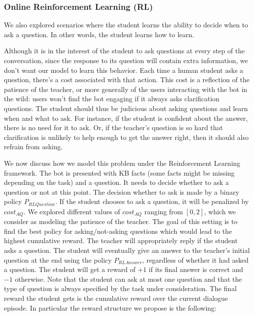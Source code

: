 \subsubsection{Online Reinforcement Learning (RL)}
We also explored scenarios where the student
learns the ability to decide when to ask a question. In other
words, the student learns how to learn.

Although it is in the interest of the student to ask questions at every
step of the conversation, since the response to its question will contain
extra information, we don't want our model to learn this behavior.
Each time a human student asks a question, there's a cost associated with that
action. This cost is a reflection of the patience of the teacher,
or more generally of the users interacting with the bot in the wild:
users won't find the bot engaging if it always
asks clarification questions. The student should thus be judicious about
asking questions and learn when and what to ask.
For instance, if the student is confident about the answer, there is no need
for it to ask. Or, if the teacher's question is so hard
that clarification is unlikely to help enough to get the answer right,
then it should also refrain from asking.

We now discuss how we model this problem under the Reinforcement Learning
framework. The bot is presented with KB facts (some facts might be missing
depending on the task) and a question. It needs to decide whether to ask a
question or not at this point. The decision  whether to ask
is made by a binary policy $P_{RLQuestion}$. If
the student  chooses to ask a question, it will be penalized by $cost_{AQ}$.
We explored different values of $cost_{AQ}$ ranging from $[0, 2]$, which we consider
as modeling the patience of the teacher.
The goal of this setting is to find the best policy for asking/not-asking questions
which would lead to the highest cumulative reward.
The teacher will appropriately reply if the student asks a question.
The student will eventually give an answer to the teacher's initial question
at the end using the policy $P_{RLAnswer}$, regardless of whether it had asked a
question. The student will get a reward of $+1$ if its final answer
is correct and  $-1$ otherwise. %
Note that the student can ask at most one question and that the type of
question is always specified by the task under consideration.
The final reward the student gets is the cumulative reward over the
current dialogue episode. In particular the reward structure we propose is the
following:

